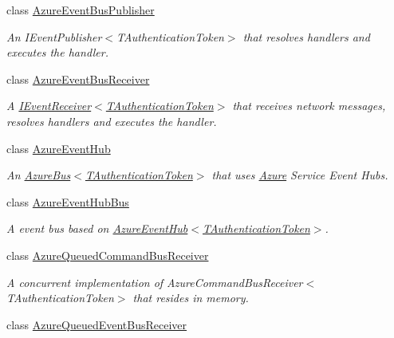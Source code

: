 \begin{DoxyCompactItemize}
class \hyperlink{classCqrs_1_1Azure_1_1ServiceBus_1_1AzureEventBusPublisher}{Azure\+Event\+Bus\+Publisher}
\begin{DoxyCompactList}\small\item\em An I\+Event\+Publisher$<$\+T\+Authentication\+Token$>$ that resolves handlers and executes the handler. \end{DoxyCompactList}\item 
class \hyperlink{classCqrs_1_1Azure_1_1ServiceBus_1_1AzureEventBusReceiver}{Azure\+Event\+Bus\+Receiver}
\begin{DoxyCompactList}\small\item\em A \hyperlink{interfaceCqrs_1_1Events_1_1IEventReceiver}{I\+Event\+Receiver$<$\+T\+Authentication\+Token$>$} that receives network messages, resolves handlers and executes the handler. \end{DoxyCompactList}\item 
class \hyperlink{classCqrs_1_1Azure_1_1ServiceBus_1_1AzureEventHub}{Azure\+Event\+Hub}
\begin{DoxyCompactList}\small\item\em An \hyperlink{classCqrs_1_1Azure_1_1ServiceBus_1_1AzureBus_a1046ff74282fd178f43e28420433d2a9_a1046ff74282fd178f43e28420433d2a9}{Azure\+Bus$<$\+T\+Authentication\+Token$>$} that uses \hyperlink{namespaceCqrs_1_1Azure}{Azure} Service Event Hubs. \end{DoxyCompactList}\item 
class \hyperlink{classCqrs_1_1Azure_1_1ServiceBus_1_1AzureEventHubBus}{Azure\+Event\+Hub\+Bus}
\begin{DoxyCompactList}\small\item\em A event bus based on \hyperlink{classCqrs_1_1Azure_1_1ServiceBus_1_1AzureEventHub_a2b548165ac5b1e3d0312af5c62e3c6cd_a2b548165ac5b1e3d0312af5c62e3c6cd}{Azure\+Event\+Hub$<$\+T\+Authentication\+Token$>$}. \end{DoxyCompactList}\item 
class \hyperlink{classCqrs_1_1Azure_1_1ServiceBus_1_1AzureQueuedCommandBusReceiver}{Azure\+Queued\+Command\+Bus\+Receiver}
\begin{DoxyCompactList}\small\item\em A concurrent implementation of Azure\+Command\+Bus\+Receiver$<$\+T\+Authentication\+Token$>$ that resides in memory. \end{DoxyCompactList}\item 
class \hyperlink{classCqrs_1_1Azure_1_1ServiceBus_1_1AzureQueuedEventBusReceiver}{Azure\+Queued\+Event\+Bus\+Receiver}

\end{DoxyCompactItemize}
